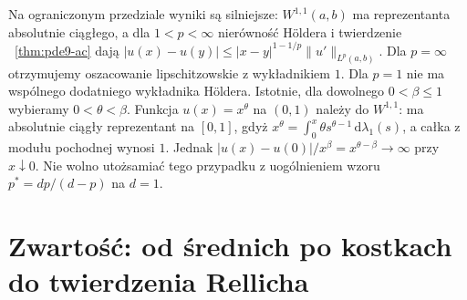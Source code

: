 \begin{uwaga}[Wymiar $d=1$]
Na ograniczonym przedziale wyniki są silniejsze:
$W^{1,1}(a,b)$ ma reprezentanta absolutnie ciągłego,
a dla $1<p<\infty$ nierówność Höldera i twierdzenie
~\ref{thm:pde9-ac} dają
$|u(x)-u(y)|\le |x-y|^{1-1/p}\|u'\|_{L^p(a,b)}$.
Dla $p=\infty$ otrzymujemy oszacowanie lipschitzowskie
z wykładnikiem $1$. Dla $p=1$ nie ma wspólnego
dodatniego wykładnika Höldera. Istotnie, dla dowolnego
$0<\beta\le1$ wybieramy $0<\theta<\beta$.
Funkcja $u(x)=x^\theta$ na $(0,1)$ należy do
$W^{1,1}$: ma absolutnie ciągły reprezentant na $[0,1]$,
gdyż $x^\theta=\int_0^x\theta s^{\theta-1}
\,\mathrm d\lambda_1(s)$, a całka z modułu pochodnej
wynosi $1$. Jednak
$|u(x)-u(0)|/x^\beta=x^{\theta-\beta}\to\infty$
przy $x\downarrow0$.
Nie wolno utożsamiać tego przypadku z uogólnieniem wzoru
$p^*=dp/(d-p)$ na $d=1$.
\end{uwaga}

\section{Zwartość: od średnich po kostkach do twierdzenia Rellicha}
\label{sec:pde10-Rellich}

